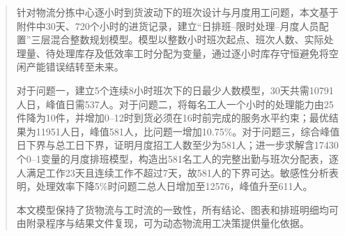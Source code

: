 \begin{abstract}
针对物流分拣中心逐小时到货波动下的班次设计与月度用工问题，本文基于附件中30天、720个小时的进货记录，建立“日排班--限时处理--月度人员配置”三层混合整数规划模型。模型以整数小时班次起点、班次人数、实际处理量、待处理库存及低效率工时分配为变量，通过逐小时库存守恒避免将空闲产能错误结转至未来。

对于问题一，建立5个连续8小时班次下的日最少人数模型，30天共需10791人日，峰值日需537人。对于问题二，将每名工人一个小时的处理能力由25件降为10件，并增加0--12时到货必须在16时前完成的服务水平约束；最优结果为11951人日，峰值581人，比问题一增加10.75\%。对于问题三，综合峰值日下界与总工日下界，证明月度招工人数至少为581人；进一步求解含17430个0--1变量的月度排班模型，构造出581名工人的完整出勤与班次分配表，逐人满足工作23天且连续工作不超过7天，故581人的下界可达。敏感性分析表明，处理效率下降5\%时问题二总人日增加至12576，峰值升至611人。

本文模型保持了货物流与工时流的一致性，所有结论、图表和排班明细均可由附录程序与结果文件复现，可为动态物流用工决策提供量化依据。
\end{abstract}
